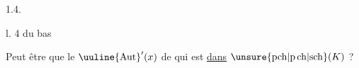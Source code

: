 1.4. 

l. 4 du bas

Peut être que le  $\text{\uuline{Aut}}'(x)$
 de  qui est \uline{dans} $\unsure{\mathrm{pch}|\mathrm{p\,ch}|\mathrm{sch}}(K)$ ?
